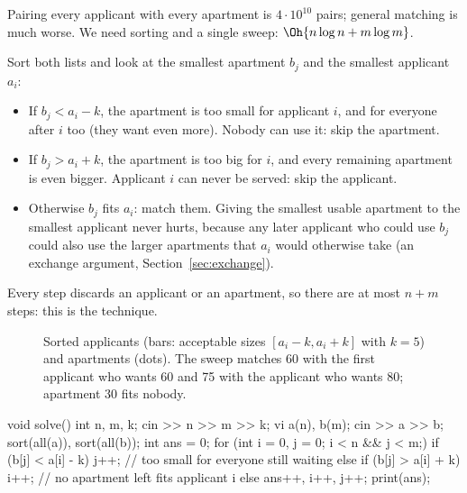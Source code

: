  Pairing every applicant with every apartment is $4\cdot10^{10}$ pairs; general matching is much
worse. We need sorting and a single sweep: $\Oh{n\log n + m\log m}$.

 Sort both lists and look at the smallest apartment $b_j$ and the smallest applicant $a_i$:
\begin{itemize}
  \item If $b_j < a_i - k$, the apartment is too small for applicant $i$, and for everyone after $i$ too (they want even
        more). Nobody can use it: skip the apartment.
  \item If $b_j > a_i + k$, the apartment is too big for $i$, and every remaining apartment is even bigger. Applicant $i$
        can never be served: skip the applicant.
  \item Otherwise $b_j$ fits $a_i$: match them. Giving the smallest usable apartment to the smallest applicant never hurts,
        because any later applicant who could use $b_j$ could also use the larger apartments that $a_i$ would otherwise
        take (an exchange argument, Section~\ref{sec:exchange}).
\end{itemize}
Every step discards an applicant or an apartment, so there are at most $n + m$ steps: this is the 
technique.

\begin{figure}[H]
\centering
{}
\caption{Sorted applicants (bars: acceptable sizes $[a_i - k, a_i + k]$ with $k = 5$) and apartments (dots). The sweep
matches 60 with the first applicant who wants 60 and 75 with the applicant who wants 80; apartment 30 fits nobody.}
\end{figure}

\begin{code}
void solve() {
    int n, m, k;
    cin >> n >> m >> k;
    vi a(n), b(m);
    cin >> a >> b;
    sort(all(a)), sort(all(b));
    int ans = 0;
    for (int i = 0, j = 0; i < n && j < m;) {
        if (b[j] < a[i] - k) j++;       // too small for everyone still waiting
        else if (b[j] > a[i] + k) i++;  // no apartment left fits applicant i
        else ans++, i++, j++;
    }
    print(ans);
}
\end{code}


